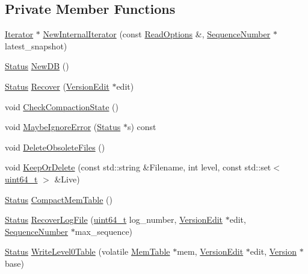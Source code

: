 \subsection*{Private Member Functions}
\begin{DoxyCompactItemize}
\item 
\hyperlink{classleveldb_1_1_iterator}{Iterator} $\ast$ \hyperlink{classleveldb_1_1_d_b_impl_af4cf17ab446a4797270aad502f1c3f3d}{New\+Internal\+Iterator} (const \hyperlink{structleveldb_1_1_read_options}{Read\+Options} \&, \hyperlink{namespaceleveldb_a5481ededd221c36d652c371249f869fa}{Sequence\+Number} $\ast$latest\+\_\+snapshot)
\item 
\hyperlink{classleveldb_1_1_status}{Status} \hyperlink{classleveldb_1_1_d_b_impl_acfd8ee23923b6a2afb3016831d751b9b}{New\+D\+B} ()
\item 
\hyperlink{classleveldb_1_1_status}{Status} \hyperlink{classleveldb_1_1_d_b_impl_aba537e56669df2c19fc439fd9f4227d5}{Recover} (\hyperlink{classleveldb_1_1_version_edit}{Version\+Edit} $\ast$edit)
\item 
void \hyperlink{classleveldb_1_1_d_b_impl_a0b176cdad75907cedd869139a3342ff0}{Check\+Compaction\+State} ()
\item 
void \hyperlink{classleveldb_1_1_d_b_impl_ac957f408efe2e4a110ef3e45760bd5bf}{Maybe\+Ignore\+Error} (\hyperlink{classleveldb_1_1_status}{Status} $\ast$s) const 
\item 
void \hyperlink{classleveldb_1_1_d_b_impl_a193cbda79a60ec9d3b83991cf7be91cf}{Delete\+Obsolete\+Files} ()
\item 
void \hyperlink{classleveldb_1_1_d_b_impl_a68c4a555a0ee5d779635062a949411b9}{Keep\+Or\+Delete} (const std\+::string \&Filename, int level, const std\+::set$<$ \hyperlink{stdint_8h_aaa5d1cd013383c889537491c3cfd9aad}{uint64\+\_\+t} $>$ \&Live)
\item 
\hyperlink{classleveldb_1_1_status}{Status} \hyperlink{classleveldb_1_1_d_b_impl_a251b1fb7890cf9ebc377ebfca4462f5a}{Compact\+Mem\+Table} ()
\item 
\hyperlink{classleveldb_1_1_status}{Status} \hyperlink{classleveldb_1_1_d_b_impl_acd0fb2878fb923809d47f547fbf2d76b}{Recover\+Log\+File} (\hyperlink{stdint_8h_aaa5d1cd013383c889537491c3cfd9aad}{uint64\+\_\+t} log\+\_\+number, \hyperlink{classleveldb_1_1_version_edit}{Version\+Edit} $\ast$edit, \hyperlink{namespaceleveldb_a5481ededd221c36d652c371249f869fa}{Sequence\+Number} $\ast$max\+\_\+sequence)
\item 
\hyperlink{classleveldb_1_1_status}{Status} \hyperlink{classleveldb_1_1_d_b_impl_ae491d85586e72c5cd624ee5a8ee3e852}{Write\+Level0\+Table} (volatile \hyperlink{classleveldb_1_1_mem_table}{Mem\+Table} $\ast$mem, \hyperlink{classleveldb_1_1_version_edit}{Version\+Edit} $\ast$edit, \hyperlink{classleveldb_1_1_version}{Version} $\ast$base)

\end{DoxyCompactItemize}
